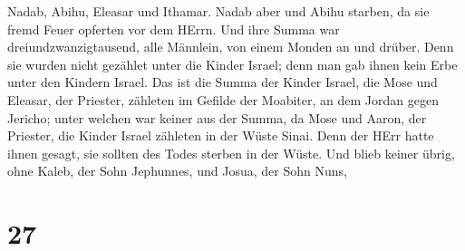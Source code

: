 Nadab, Abihu, Eleasar und Ithamar.  Nadab aber und Abihu
starben, da sie fremd Feuer opferten vor dem HErrn.  Und
ihre Summa war dreiundzwanzigtausend, alle Männlein, von einem Monden an
und drüber. Denn sie wurden nicht gezählet unter die Kinder Israel; denn
man gab ihnen kein Erbe unter den Kindern Israel.  Das ist
die Summa der Kinder Israel, die Mose und Eleasar, der Priester,
zähleten im Gefilde der Moabiter, an dem Jordan gegen Jericho;
 unter welchen war keiner aus der Summa, da Mose und Aaron,
der Priester, die Kinder Israel zähleten in der Wüste Sinai.
 Denn der HErr hatte ihnen gesagt, sie sollten des Todes
sterben in der Wüste. Und blieb keiner übrig, ohne Kaleb, der Sohn
Jephunnes, und Josua, der Sohn Nuns,

\hypertarget{section-26}{%
\section{27}\label{section-26}}

